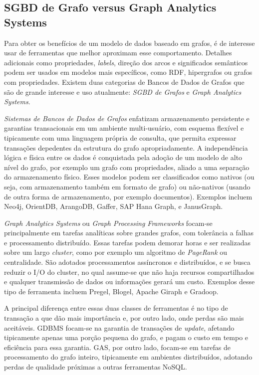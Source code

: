 \documentclass[conference]{IEEEtran}
\begin{document}
\subsection{SGBD de Grafo versus Graph Analytics Systems}

Para obter os benefícios de um modelo de dados baseado em grafos, é de
interesse usar de ferramentas que melhor aproximam esse comportamento. Detalhes
adicionais como propriedades, \emph{labels}, direção dos arcos e significados
semânticos podem ser usados em modelos mais específicos, como RDF, hipergrafos
ou grafos com propriedades. Existem duas categorias de Bancos de Dados de
Grafos que são de grande interesse e uso atualmente:
\emph{SGBD de Grafos} e \emph{Graph Analytics Systems}.

\emph{Sistemas de Bancos de Dados de Grafos} enfatizam armazenamento
persistente e garantias transacionais em um ambiente multi-usuário, com esquema
flexível e tipicamente com uma linguagem própria de consulta, que permita
expressar transações depedentes da estrutura do grafo apropriadamente. A
independência lógica e física entre os dados é conquistada pela adoção de um
modelo de alto nível do grafo, por exemplo um grafo com propriedades, aliado a
uma separação do armazenamento físico. Esses modelos podem ser classificados
como nativos (ou seja, com armazenamento também em formato de grafo) ou
não-nativos (usando de outra forma de armazenamento, por exemplo documentos).
Exemplos incluem Neo4j, OrientDB, ArangoDB, Gaffer, SAP Hana Graph, e JanusGraph.

\emph{Graph Analytics Systems} ou \emph{Graph Processing Frameworks} focam-se
principalmente em tarefas analíticas sobre grandes grafos, com tolerância a
falhas e processamento distribuído. Essas tarefas podem demorar horas e ser
realizadas sobre um largo \emph{cluster}, como por exemplo um algoritmo de
\emph{PageRank} ou centralidade. São adotados processamentos assíncronos e
distribuídos, e se busca reduzir o I/O do cluster, no qual assume-se que não
haja recursos compartilhados e qualquer transmissão de dados ou informações
gerará um custo. Exemplos desse tipo de ferramenta incluem Pregel, Blogel,
Apache Giraph e Gradoop.

A principal diferença entre essas duas classes de ferramentas é no tipo de
transação a que dão mais importância e, por outro lado, onde perdas são mais
aceitáveis. GDBMS focam-se na garantia de transações de \emph{update}, afetando
tipicamente apenas uma porção pequena do grafo, e pagam o custo em tempo e
eficiência para essa garantia. GAS, por outro lado, focam-se em tarefas de
processamento do grafo inteiro, tipicamente em ambientes distribuídos, adotando
perdas de qualidade próximas a outras ferramentas NoSQL.
\end{document}
